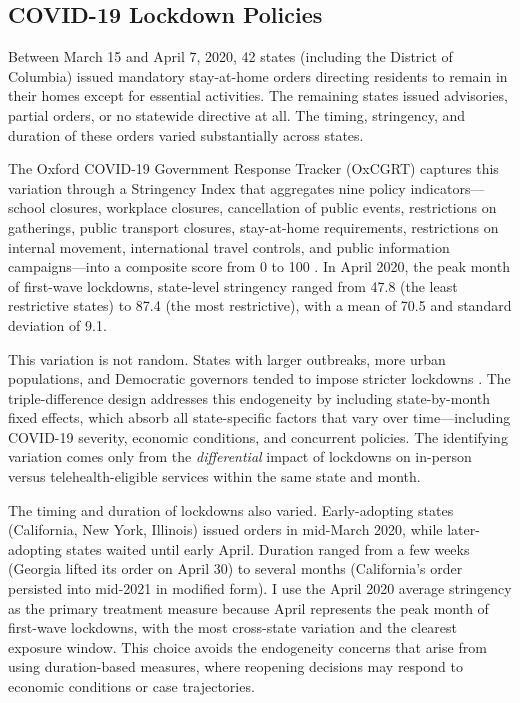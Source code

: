 \documentclass[12pt]{article}
\begin{document}
\subsection{COVID-19 Lockdown Policies}

Between March 15 and April 7, 2020, 42 states (including the District of Columbia) issued mandatory stay-at-home orders directing residents to remain in their homes except for essential activities. The remaining states issued advisories, partial orders, or no statewide directive at all. The timing, stringency, and duration of these orders varied substantially across states.

The Oxford COVID-19 Government Response Tracker (OxCGRT) captures this variation through a Stringency Index that aggregates nine policy indicators---school closures, workplace closures, cancellation of public events, restrictions on gatherings, public transport closures, stay-at-home requirements, restrictions on internal movement, international travel controls, and public information campaigns---into a composite score from 0 to 100 \citep{hale2021global}. In April 2020, the peak month of first-wave lockdowns, state-level stringency ranged from 47.8 (the least restrictive states) to 87.4 (the most restrictive), with a mean of 70.5 and standard deviation of 9.1.

This variation is not random. States with larger outbreaks, more urban populations, and Democratic governors tended to impose stricter lockdowns \citep{adolph2021}. The triple-difference design addresses this endogeneity by including state-by-month fixed effects, which absorb all state-specific factors that vary over time---including COVID-19 severity, economic conditions, and concurrent policies. The identifying variation comes only from the \textit{differential} impact of lockdowns on in-person versus telehealth-eligible services within the same state and month.

The timing and duration of lockdowns also varied. Early-adopting states (California, New York, Illinois) issued orders in mid-March 2020, while later-adopting states waited until early April. Duration ranged from a few weeks (Georgia lifted its order on April 30) to several months (California's order persisted into mid-2021 in modified form). I use the April 2020 average stringency as the primary treatment measure because April represents the peak month of first-wave lockdowns, with the most cross-state variation and the clearest exposure window. This choice avoids the endogeneity concerns that arise from using duration-based measures, where reopening decisions may respond to economic conditions or case trajectories.
\end{document}
